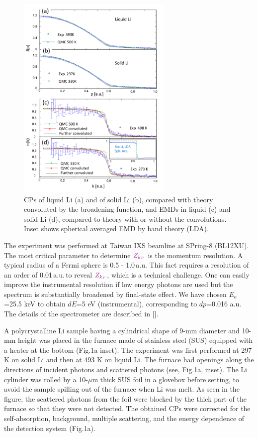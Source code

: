 \documentclass[twocolumn,showpacs,showkeys,fleqn,prl,superscriptaddress]{revtex4}%
\begin{document}
\begin{figure}
\includegraphics[bb= 50 10 500 720, width=7.5cm]{fig2.pdf}
\caption{CPs of liquid Li (a) and of solid Li (b), compared with theory convoluted by the broadening function, and EMDs in liquid (c) and solid Li (d), compared to theory with or without the convolutions. Inset shows spherical averaged EMD by band theory (LDA).  
} 
\label{Fig.2}
\end{figure}

The experiment was performed at Taiwan IXS beamline at SPring-8 (BL12XU).
The most critical parameter to determine ${\color{violet}Z_{k_F}}$ is the momentum resolution. 
A typical radius of a Fermi sphere is 0.5 - 1.0\,a.u. This fact requires a resolution of an order of 0.01\,a.u.\,to reveal ${\color{violet}Z_{k_F}}$, which is a technical challenge.
One can easily improve the instrumental resolution if low energy photons are used but the spectrum is substantially broadened by final-state effect\cite{stern00,soi01}.
We have chosen $E_o$=25.5 keV to obtain $dE$=5 eV (instrumental), corresponding to $dp$=0.016 a.u.
The details of the spectrometer are described in []. 


A polycrystalline Li sample having a cylindrical shape of 9-mm diameter and 10-mm height was placed in the furnace made of stainless steel (SUS) equipped with a heater at the bottom (Fig.1a inset).
The experiment was first performed at 297 K on solid Li and then at 493 K on liquid Li. 
The furnace had openings along the directions of incident photons and scattered photons (see, Fig.1a, inset).
The Li cylinder was rolled by a 10-$\mu$m thick SUS foil in a glovebox before setting, to avoid the sample spilling out of the furnace when Li was melt.
As seen in the figure, the scattered photons from the foil were blocked by the thick part of the furnace so that they were not detected.
The obtained CPs were corrected for the self-absorption, background, multiple scattering, and the energy dependence of the detection system (Fig.1a).
\end{document}
